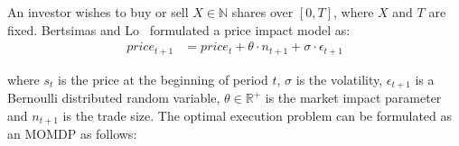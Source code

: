 An investor wishes to buy or sell {\footnotesize $ X \in \mathbb{N} $} shares over {\footnotesize $ [0, T] $}, where {\footnotesize $ X $} and {\footnotesize $ T $} are fixed. Bertsimas and Lo~\parencite{Bertsimas_JFM_1998} formulated a price impact model as:
\begin{align*}
    price_{t+1} &= price_t + \theta \cdot n_{t + 1} + \sigma \cdot \epsilon_{t+1}
\end{align*}

where {\footnotesize $ s_t $ } is the price at the beginning of period {\footnotesize $ t $}, {\footnotesize $\sigma$} is the volatility, {\footnotesize $\epsilon_{t+1}$} is a Bernoulli distributed random variable, {\footnotesize $\theta \in \mathbb{R}^{+}$ } is the market impact parameter and {\footnotesize $n_{t + 1}$} is the trade size. The optimal execution problem can be formulated as an MOMDP as follows:
